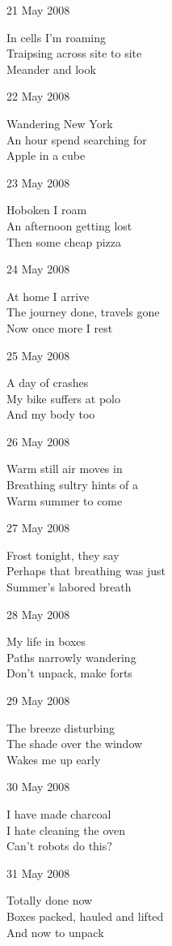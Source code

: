 \documentclass[12pt]{article}
\begin{document}
21 May 2008

In cells I'm roaming \\
Traipsing across site to site \\
Meander and look

22 May 2008

Wandering New York \\
An hour spend searching for \\
Apple in a cube

23 May 2008

Hoboken I roam \\
An afternoon getting lost \\
Then some cheap pizza

24 May 2008

At home I arrive \\
The journey done, travels gone \\
Now once more I rest 


\newpage

25 May 2008

A day of crashes \\
My bike suffers at polo \\
And my body too

26 May 2008

Warm still air moves in \\
Breathing sultry hints of a  \\
Warm summer to come

27 May 2008

Frost tonight, they say \\
Perhaps that breathing was just \\
Summer's labored breath

28 May 2008

My life in boxes \\
Paths narrowly wandering \\
Don't unpack, make forts

29 May 2008

The breeze disturbing \\
The shade over the window \\
Wakes me up early

30 May 2008

I have made charcoal \\
I hate cleaning the oven \\
Can't robots do this?

31 May 2008

Totally done now \\
Boxes packed, hauled and lifted \\
And now to unpack
\end{document}
